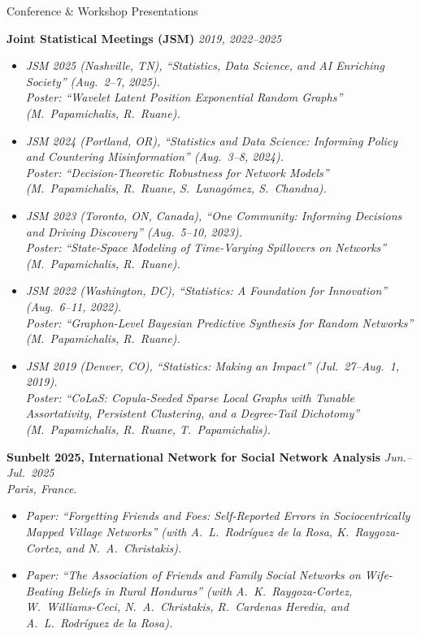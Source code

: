 \documentclass{resume}
\begin{document}
\begin{rSection}{Conference \& Workshop Presentations}

{\bf Joint Statistical Meetings (JSM)} \hfill {\em 2019, 2022--2025}
\begin{itemize}
\item \textit{JSM 2025 (Nashville, TN), ``Statistics, Data Science, and AI Enriching Society'' (Aug.\ 2--7, 2025).}\\
\hspace*{1em}\textit{Poster: ``Wavelet Latent Position Exponential Random Graphs'' (M.\ Papamichalis, R.\ Ruane).}
\item \textit{JSM 2024 (Portland, OR), ``Statistics and Data Science: Informing Policy and Countering Misinformation'' (Aug.\ 3--8, 2024).}\\
\hspace*{1em}\textit{Poster: ``Decision-Theoretic Robustness for Network Models'' (M.\ Papamichalis, R.\ Ruane, S.\ Lunag\'omez, S.\ Chandna).}
\item \textit{JSM 2023 (Toronto, ON, Canada), ``One Community: Informing Decisions and Driving Discovery'' (Aug.\ 5--10, 2023).}\\
\hspace*{1em}\textit{Poster: ``State-Space Modeling of Time-Varying Spillovers on Networks'' (M.\ Papamichalis, R.\ Ruane).}
\item \textit{JSM 2022 (Washington, DC), ``Statistics: A Foundation for Innovation'' (Aug.\ 6--11, 2022).}\\
\hspace*{1em}\textit{Poster: ``Graphon-Level Bayesian Predictive Synthesis for Random Networks'' (M.\ Papamichalis, R.\ Ruane).}
\item \textit{JSM 2019 (Denver, CO), ``Statistics: Making an Impact'' (Jul.\ 27--Aug.\ 1, 2019).}\\
\hspace*{1em}\textit{Poster: ``CoLaS: Copula-Seeded Sparse Local Graphs with Tunable Assortativity, Persistent Clustering, and a Degree-Tail Dichotomy'' (M.\ Papamichalis, R.\ Ruane, T.\ Papamichalis).}
\end{itemize}

{\bf Sunbelt 2025, International Network for Social Network Analysis} \hfill {\em Jun.--Jul.\ 2025}\\
\textit{Paris, France.}
\begin{itemize}
\item \textit{Paper: ``Forgetting Friends and Foes: Self-Reported Errors in Sociocentrically Mapped Village Networks'' (with A.\ L.\ Rodr\'iguez de la Rosa, K.\ Raygoza-Cortez, and N.\ A.\ Christakis).}
\item \textit{Paper: ``The Association of Friends and Family Social Networks on Wife-Beating Beliefs in Rural Honduras'' (with A.\ K.\ Raygoza-Cortez, W.\ Williams-Ceci, N.\ A.\ Christakis, R.\ Cardenas Heredia, and A.\ L.\ Rodr\'iguez de la Rosa).}
\end{itemize}


\end{rSection}
\end{document}
